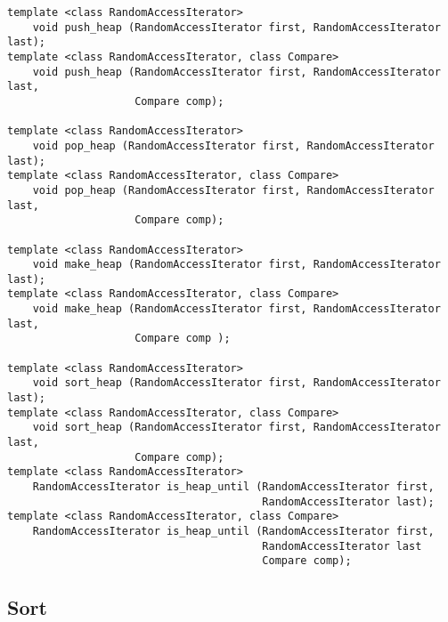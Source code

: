 \documentclass[a4paper]{article}
\begin{document}
\begin{verbatim}
template <class RandomAccessIterator>
	void push_heap (RandomAccessIterator first, RandomAccessIterator last);
template <class RandomAccessIterator, class Compare>
	void push_heap (RandomAccessIterator first, RandomAccessIterator last,
					Compare comp);
					
template <class RandomAccessIterator>
	void pop_heap (RandomAccessIterator first, RandomAccessIterator last);
template <class RandomAccessIterator, class Compare>
	void pop_heap (RandomAccessIterator first, RandomAccessIterator last,
					Compare comp);
					
template <class RandomAccessIterator>
	void make_heap (RandomAccessIterator first, RandomAccessIterator last);
template <class RandomAccessIterator, class Compare>
	void make_heap (RandomAccessIterator first, RandomAccessIterator last,
					Compare comp );
					
template <class RandomAccessIterator>
	void sort_heap (RandomAccessIterator first, RandomAccessIterator last);
template <class RandomAccessIterator, class Compare>
	void sort_heap (RandomAccessIterator first, RandomAccessIterator last,
					Compare comp);
template <class RandomAccessIterator>
	RandomAccessIterator is_heap_until (RandomAccessIterator first,
										RandomAccessIterator last);
template <class RandomAccessIterator, class Compare>
	RandomAccessIterator is_heap_until (RandomAccessIterator first,
										RandomAccessIterator last
										Compare comp);
\end{verbatim}

\subsection{Sort}
\end{document}
